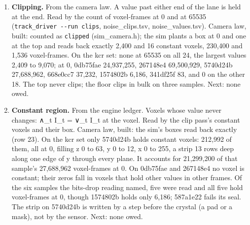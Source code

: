 \begin{enumerate}
\item \textbf{Clipping.} From the camera law. A value past either end of the lane is held at the end. Read by the count of voxel-frames at 0 and at 65535 (\texttt{track\_\allowbreak{}driver -\allowbreak{}-\allowbreak{}run clips}, noise\_\allowbreak{}clips.tsv, noise\_\allowbreak{}values.tsv). Camera law, built: counted as \texttt{clipped} (sim\_\allowbreak{}camera.h); the sim plants a box at 0 and one at the top and reads back exactly 2,400 and 16 constant voxels, 230,400 and 1,536 voxel-frames. On the kcr set: none at 65535 on all 24, the largest values 2,409 to 9,070; at 0, 0db75fae 24,937,255, 267148e4 69,500,929, 5740d24b 27,688,962, 668e0cc7 37,232, 1574802b 6,186, 341df25f 83, and 0 on the other 18. The top never clips; the floor clips in bulk on three samples. Next: none owed.
\item \textbf{Constant region.} From the engine ledger. Voxels whose value never changes: ∧\_\allowbreak{}t I\_\allowbreak{}t = ∨\_\allowbreak{}t I\_\allowbreak{}t at the voxel. Read by the clip pass's constant voxels and their box. Camera law, built: the sim's boxes read back exactly (row 23). On the kcr set only 5740d24b holds constant voxels: 212,992 of them, all at 0, filling z 0 to 63, y 0 to 12, x 0 to 255, a strip 13 rows deep along one edge of y through every plane. It accounts for 21,299,200 of that sample's 27,688,962 voxel-frames at 0. On 0db75fae and 267148e4 no voxel is constant; their zeros fall in voxels that hold other values in other frames. Of the six samples the bits-drop reading named, five were read and all five hold voxel-frames at 0, though 1574802b holds only 6,186; 587a1e22 fails its seal. The strip on 5740d24b is written by a step before the crystal (a pad or a mask), not by the sensor. Next: none owed.

\end{enumerate}
